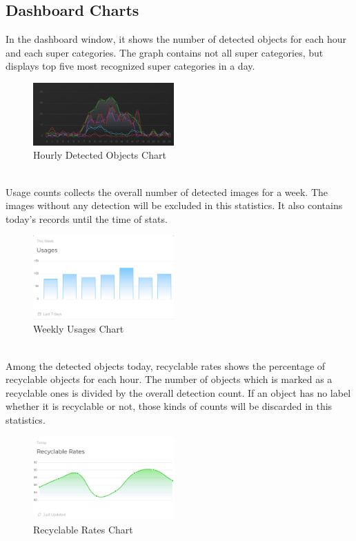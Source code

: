 \documentclass[conference]{IEEEtran}
\begin{document}
\newpage
\subsection{Dashboard Charts}
In the dashboard window, it shows the number of detected objects for each hour and each super categories. The graph contains not all super categories, but displays top five most recognized super categories in a day.~\\

\begin{figure}[h]
    \centering
    \includegraphics[width=0.48\textwidth]{images/chart_hourly_detected.eps}
    \caption{Hourly Detected Objects Chart}
\end{figure}~\\

Usage counts collects the overall number of detected images for a week. The images without any detection will be excluded in this statistics. It also contains today's records until the time of stats.~\\

\begin{figure}[h]
    \centering
    \includegraphics[width=0.48\textwidth]{images/chart_usage_counts.eps}
    \caption{Weekly Usages Chart}
\end{figure}~\\

Among the detected objects today, recyclable rates shows the percentage of recyclable objects for each hour. The number of objects which is marked as a recyclable ones is divided by the overall detection count. If an object has no label whether it is recyclable or not, those kinds of counts will be discarded in this statistics.~\\

\begin{figure}[h]
    \centering
    \includegraphics[width=0.48\textwidth]{images/chart_recyclable_rate.eps}
    \caption{Recyclable Rates Chart}
\end{figure}~\\
\end{document}
